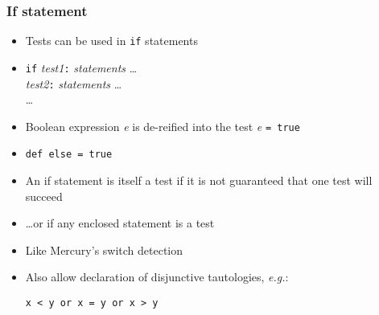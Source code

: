 \documentclass[12pt]{beamer}
\begin{document}
\begin{frame}
\frametitle{If statement}
\begin{itemize}
\item Tests can be used in \texttt{if} statements
\item \texttt{if} \emph{test1}\texttt{:} \emph{statements} \ldots \\
\hspace*{1em} \emph{test2}\texttt{:} \emph{statements} \ldots \\
\hspace*{1em} \ldots \\
\item Boolean expression \emph{e} is de-reified into the test \emph{e}
  \texttt{= true}
\item \texttt{def else = true}
\item An if statement is itself a test if it is not guaranteed that
  one test will succeed
\item \ldots or if any enclosed statement is a test
\item Like Mercury's switch detection
\item Also allow declaration of disjunctive tautologies, \emph{e.g.}:\\
  \centerline{\texttt{x < y or x = y or x > y}}
\end{itemize}
\end{frame}
\end{document}
